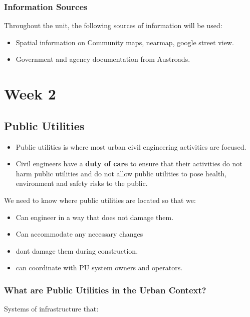 \documentclass{report}
\begin{document}
	\subsection{Information Sources}
	Throughout the unit, the following sources of information will be used:
	\begin{itemize}
		\item Spatial information on Community maps, nearmap, google street view. 
		\item Government and agency documentation from Austroads. 
	\end{itemize}


	
	\newpage

	\chapter{Week 2}

	\section{Public Utilities}

	\begin{itemize}
		\item Public utilities is where most urban civil engineering activities are focused.
		\item Civil engineers have a \textbf{duty of care} to ensure that their activities do not harm public utilities and do not allow public utilities to pose health, environment and safety risks to the public.
	\end{itemize}

	We need to know where public utilities are located so that we:

	\begin{itemize}
		\item Can engineer in a way that does not damage them.
		\item Can accommodate any necessary changes
		\item dont damage them during construction.
		\item can coordinate with PU system owners and operators.
	\end{itemize}

	\subsection{What are Public Utilities in the Urban Context?}
	Systems of infrastructure that:
\end{document}
